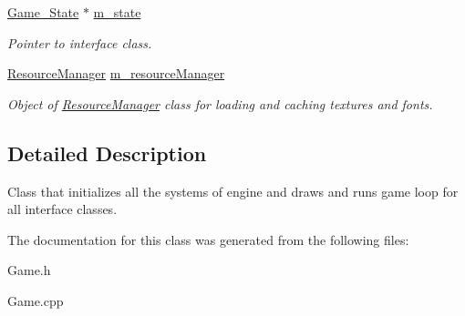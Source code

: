 \begin{DoxyCompactItemize}
\item 
\hyperlink{classGame__State}{Game\+\_\+\+State} $\ast$ \hyperlink{classGame_ad598be09d1e317902516497800d009d4}{m\+\_\+state}\hypertarget{classGame_ad598be09d1e317902516497800d009d4}{}\label{classGame_ad598be09d1e317902516497800d009d4}

\begin{DoxyCompactList}\small\item\em Pointer to interface class. \end{DoxyCompactList}\item 
\hyperlink{classResourceManager}{Resource\+Manager} \hyperlink{classGame_a3e0434bc530e45b6b185e8adc06ce014}{m\+\_\+resource\+Manager}\hypertarget{classGame_a3e0434bc530e45b6b185e8adc06ce014}{}\label{classGame_a3e0434bc530e45b6b185e8adc06ce014}

\begin{DoxyCompactList}\small\item\em Object of \hyperlink{classResourceManager}{Resource\+Manager} class for loading and caching textures and fonts. \end{DoxyCompactList}\end{DoxyCompactItemize}


\subsection{Detailed Description}
Class that initializes all the systems of engine and draws and runs game loop for all interface classes. 

The documentation for this class was generated from the following files\+:\begin{DoxyCompactItemize}
\item 
Game.\+h\item 
Game.\+cpp\end{DoxyCompactItemize}
